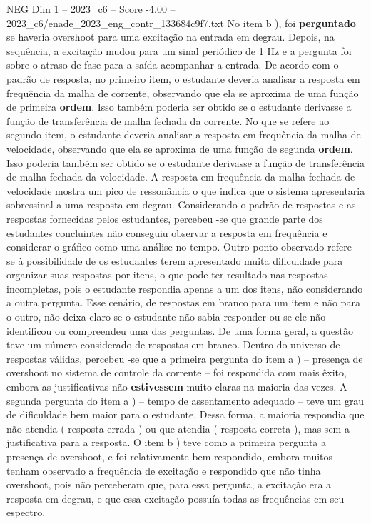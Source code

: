\begin{textsample}{NEG Dim 1 – 2023\_c6 – Score -4.00 – 2023\_c6/enade\_2023\_eng\_contr\_133684c9f7.txt}
No item b ), foi \textbf{perguntado} se haveria overshoot para uma excitação na entrada em degrau.
Depois, na sequência, a excitação mudou para um sinal periódico de 1 Hz e a pergunta foi sobre o atraso de fase para a saída acompanhar a entrada.
De acordo com o padrão de resposta, no primeiro item, o estudante deveria analisar a resposta em frequência da malha de corrente, observando que ela se aproxima de uma função de primeira \textbf{ordem}.
Isso também poderia ser obtido se o estudante derivasse a função de transferência de malha fechada da corrente.
No que se refere ao segundo item, o estudante deveria analisar a resposta em frequência da malha de velocidade, observando que ela se aproxima de uma função de segunda \textbf{ordem}.
Isso poderia também ser obtido se o estudante derivasse a função de transferência de malha fechada da velocidade.
A resposta em frequência da malha fechada de velocidade mostra um pico de ressonância o que indica que o sistema apresentaria sobressinal a uma resposta em degrau.
Considerando o padrão de respostas e as respostas fornecidas pelos estudantes, percebeu -se que grande parte dos estudantes concluintes não conseguiu observar a resposta em frequência e considerar o gráfico como uma análise no tempo.
Outro ponto observado refere -se à possibilidade de os estudantes terem apresentado muita dificuldade para organizar suas respostas por itens, o que pode ter resultado nas respostas incompletas, pois o estudante respondia apenas a um dos itens, não considerando a outra pergunta.
Esse cenário, de respostas em branco para um item e não para o outro, não deixa claro se o estudante não sabia responder ou se ele não identificou ou compreendeu uma das perguntas.
De uma forma geral, a questão teve um número considerado de respostas em branco.
Dentro do universo de respostas válidas, percebeu -se que a primeira pergunta do item a ) – presença de overshoot no sistema de controle da corrente – foi respondida com mais êxito, embora as justificativas não \textbf{estivessem} muito claras na maioria das vezes.
A segunda pergunta do item a ) – tempo de assentamento adequado – teve um grau de dificuldade bem maior para o estudante.
Dessa forma, a maioria respondia que não atendia ( resposta errada ) ou que atendia ( resposta correta ), mas sem a justificativa para a resposta.
O item b ) teve como a primeira pergunta a presença de overshoot, e foi relativamente bem respondido, embora muitos tenham observado a frequência de excitação e respondido que não tinha overshoot, pois não perceberam que, para essa pergunta, a excitação era a resposta em degrau, e que essa excitação possuía todas as frequências em seu espectro.

\end{textsample}
